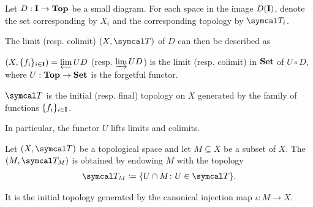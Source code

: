 \begin{proposition}\label{thm:initial_final_topology_limit}\cite{nLab:top}
  Let $D: \operatorname{\mathbf{I}} \to \operatorname{\mathbf{Top}}$ be a small diagram. For each space in the image $D(\operatorname{\mathbf{I}})$, denote the set corresponding by $X_i$ and the corresponding topology by $\Cal{T}_i$.

  The limit (resp. colimit) $(X, \Cal{T})$ of $D$ can then be described as
  \begin{defenum}
    \item $(X, \{ f_i \}_{i \in \operatorname{\mathbf{I}}}) = \varprojlim UD$ (resp. $\varinjlim UD$) is the limit (resp. colimit) in $\operatorname{\mathbf{Set}}$ of $U \circ D$, where $U: \operatorname{\mathbf{Top}} \to \operatorname{\mathbf{Set}}$ is the forgetful functor.
    \item $\Cal{T}$ is the initial (resp. final) topology on $X$ generated by the family of functions $\{ f_i \}_{i \in \operatorname{\mathbf{I}}}$.
  \end{defenum}

  In particular, the functor $U$ lifts limits and colimits.
\end{proposition}

\begin{definition}\label{def:topological_subspace}
  Let $(X, \Cal{T})$ be a topological space and let $M \subseteq X$ be a subset of $X$. The  $(M, \Cal{T}_M)$ is obtained by endowing $M$ with the topology
  \begin{align*}
    \Cal{T}_M \coloneqq \{ U \cap M \colon U \in \Cal{T} \}.
  \end{align*}

  It is the initial topology generated by the canonical injection map $\iota: M \to X$.
\end{definition}

